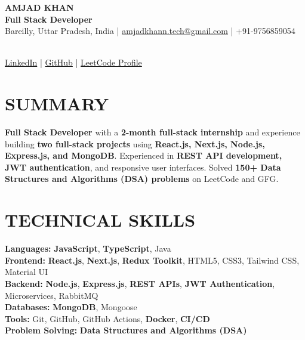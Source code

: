 \documentclass[10pt,a4paper]{article}
\begin{document}
\begin{center}

    {\LARGE \textbf{AMJAD KHAN}} \\[3pt]

    {\large \textbf{Full Stack Developer}} \\[5pt]

    Bareilly, Uttar Pradesh, India
    \quad | \quad
    \href{mailto:amjadkhann.tech@gmail.com}
    {amjadkhann.tech@gmail.com}
    \quad | \quad
    +91-9756859054

    \\[3pt]

    \href{https://www.linkedin.com/in/amjad-khan-209363320/}
    {LinkedIn}
    \quad | \quad
    \href{https://github.com/Amjadkhan9756}
    {GitHub}
    \quad | \quad
    \href{https://leetcode.com/u/amjadkhan9756/}
    {LeetCode Profile}

\end{center}

\section{SUMMARY}

\textbf{Full Stack Developer} with a \textbf{2-month full-stack internship}
and experience building \textbf{two full-stack projects} using
\textbf{React.js, Next.js, Node.js, Express.js, and MongoDB}.
Experienced in \textbf{REST API development, JWT authentication},
and responsive user interfaces. Solved \textbf{150+ Data Structures
and Algorithms (DSA) problems} on LeetCode and GFG.

\section{TECHNICAL SKILLS}

\textbf{Languages:} \textbf{JavaScript}, \textbf{TypeScript}, Java\\
\textbf{Frontend:} \textbf{React.js}, \textbf{Next.js}, \textbf{Redux Toolkit}, HTML5, CSS3, Tailwind CSS, Material UI\\
\textbf{Backend:} \textbf{Node.js}, \textbf{Express.js}, \textbf{REST APIs}, \textbf{JWT Authentication}, Microservices, RabbitMQ\\
\textbf{Databases:} \textbf{MongoDB}, Mongoose\\
\textbf{Tools:} Git, GitHub, GitHub Actions, \textbf{Docker}, \textbf{CI/CD}\\
\textbf{Problem Solving:} \textbf{Data Structures and Algorithms (DSA)}
\end{document}
